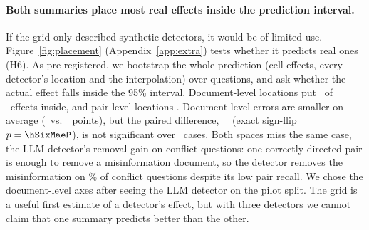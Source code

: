 \paragraph{Both summaries place most real effects inside the prediction interval.}
If the grid only described synthetic detectors, it would be of limited use. Figure~\ref{fig:placement} (Appendix~\ref{app:extra}) tests
whether it predicts real ones (H6). As pre-registered, we bootstrap the whole prediction (cell effects, every detector's
location and the interpolation) over questions, and ask whether the actual effect falls inside the 95\% interval.
Document-level locations put \hSixDocIn\ of \hSixN\ effects inside, and pair-level locations
\hSixPairIn. Document-level errors are smaller on
average (\hSixDocMae\ vs.\ \hSixPairMae\ points), but the paired difference, \hSixMaeDiff\ \hSixMaeDiffCI\ (exact
sign-flip $p=\hSixMaeP$), is not significant over \hSixN\ cases. Both spaces miss the same case, the LLM detector's
removal gain on conflict questions: one correctly directed pair is enough to remove a misinformation document, so the
detector removes the misinformation on \misGoneLlm\% of conflict questions despite its low pair recall. We chose the
document-level axes after seeing the LLM detector on the pilot split. The grid is a useful first estimate of a
detector's effect, but with three detectors we cannot claim that one summary predicts better than the other.


